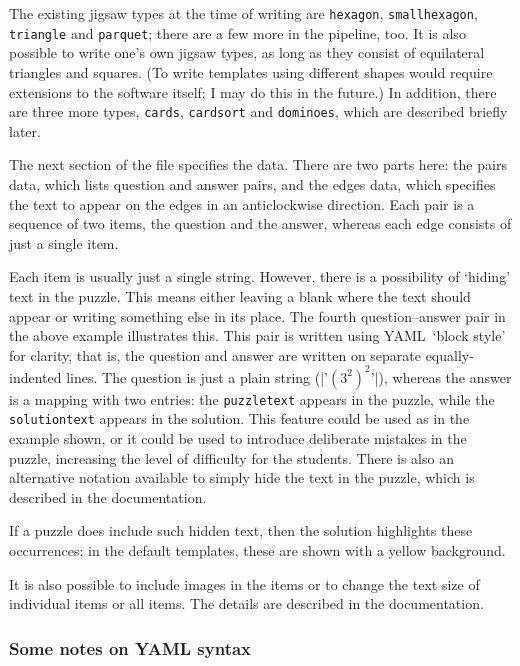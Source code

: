 \documentclass{article}
\def\YAML{{\small YAML}}
\begin{document}
The existing jigsaw types at the time of writing are \texttt{hexagon},
\texttt{smallhexagon}, \texttt{triangle} and \texttt{parquet}; there are a few more in the
pipeline, too.  It is also possible to write one's own jigsaw types,
as long as they consist of equilateral triangles and squares.  (To
write templates using different shapes would require extensions to the
software itself; I may do this in the future.)  In addition, there are
three more types, \texttt{cards}, \texttt{cardsort} and \texttt{dominoes}, which are described
briefly later.

The next section of the file specifies the data.  There are two parts
here: the pairs data, which lists question and answer pairs, and the
edges data, which specifies the text to appear on the edges in an
anticlockwise direction.  Each pair is a sequence of two items, the
question and the answer, whereas each edge consists of just a single
item.

Each item is usually just a single string.  However, there is a
possibility of `hiding' text in the puzzle.  This means either leaving
a blank where the text should appear or writing something else in its
place.  The fourth question--answer pair in the above example
illustrates this.  This pair is written using \YAML\ `block style' for
clarity, that is, the question and answer are written on separate
equally-indented lines.  The question is just a plain string
(|'$(3^2)^2$'|), whereas the answer is a mapping with two
entries: the \texttt{puzzletext} appears in the puzzle, while the
\texttt{solutiontext} appears in the solution.  This feature could be
used as in the example shown, or it could be used to introduce
deliberate mistakes in the puzzle, increasing the level of difficulty
for the students.  There is also an alternative notation available to
simply hide the text in the puzzle, which is described in the
documentation.

If a puzzle does include such hidden text, then the solution
highlights these occurrences; in the default templates, these are
shown with a yellow background.

It is also possible to include images in the items or to change the
text size of individual items or all items.  The details are described
in the documentation.

\subsubsection{Some notes on \texorpdfstring{\YAML}{YAML} syntax}
\end{document}
